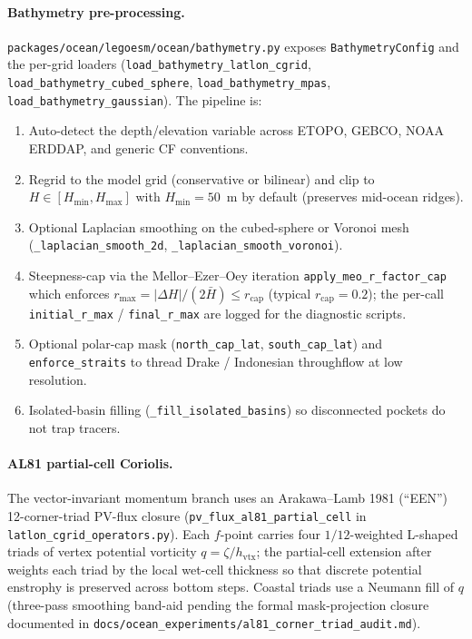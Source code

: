 \documentclass[11pt,twoside]{report}
\begin{document}
\paragraph{Bathymetry pre-processing.}
\texttt{packages/ocean/legoesm/ocean/bathymetry.py} exposes
\texttt{BathymetryConfig} and the per-grid loaders
(\texttt{load\_bathymetry\_latlon\_cgrid},
\texttt{load\_bathymetry\_cubed\_sphere},
\texttt{load\_bathymetry\_mpas},
\texttt{load\_bathymetry\_gaussian}).  The pipeline is:
\begin{enumerate}[nosep]
  \item Auto-detect the depth/elevation variable across ETOPO, GEBCO,
        NOAA ERDDAP, and generic CF conventions.
  \item Regrid to the model grid (conservative or bilinear) and clip
        to $H \in [H_{\min}, H_{\max}]$ with $H_{\min} = 50$~m by
        default (preserves mid-ocean ridges).
  \item Optional Laplacian smoothing on the cubed-sphere or
        Voronoi mesh (\texttt{\_laplacian\_smooth\_2d},
        \texttt{\_laplacian\_smooth\_voronoi}).
  \item Steepness-cap via the Mellor--Ezer--Oey iteration
        \texttt{apply\_meo\_r\_factor\_cap} which enforces
        $r_{\max} = |\Delta H|/(2\bar H) \le r_{\mathrm{cap}}$
        (typical $r_{\mathrm{cap}}=0.2$); the per-call
        \texttt{initial\_r\_max} / \texttt{final\_r\_max} are logged
        for the diagnostic scripts.
  \item Optional polar-cap mask (\texttt{north\_cap\_lat},
        \texttt{south\_cap\_lat}) and \texttt{enforce\_straits} to
        thread Drake / Indonesian throughflow at low resolution.
  \item Isolated-basin filling
        (\texttt{\_fill\_isolated\_basins}) so disconnected pockets
        do not trap tracers.
\end{enumerate}

\paragraph{AL81 partial-cell Coriolis.}
The vector-invariant momentum branch uses an Arakawa--Lamb 1981
(``EEN'') 12-corner-triad PV-flux closure
(\texttt{pv\_flux\_al81\_partial\_cell} in
\texttt{latlon\_cgrid\_operators.py}).  Each $f$-point carries four
$1/12$-weighted L-shaped triads of vertex potential vorticity
$q = \zeta/h_{\mathrm{vtx}}$; the partial-cell extension after
\citet{LeSommer2009} weights each triad by the local wet-cell
thickness so that discrete potential enstrophy is preserved across
bottom steps.  Coastal triads use a Neumann fill of $q$ (three-pass
smoothing band-aid pending the formal mask-projection closure
documented in \texttt{docs/ocean\_experiments/al81\_corner\_triad\_audit.md}).
\end{document}
